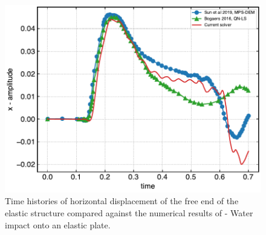 \begin{figure}
  \centering
  \includegraphics[scale=0.45]{figures/fsi/figures/sun_2019_dam_breaking_flow_impacting_an_elastic_plate/x_amplitude}
  \caption{Time histories of horizontal displacement of the free end of the
    elastic structure compared against the numerical results of
    \citep{sun2019fully,bogaers2016evaluation}- Water impact onto an elastic
    plate.}
\label{fig:water-impact-plate-deflection-quantitative}
\end{figure}
